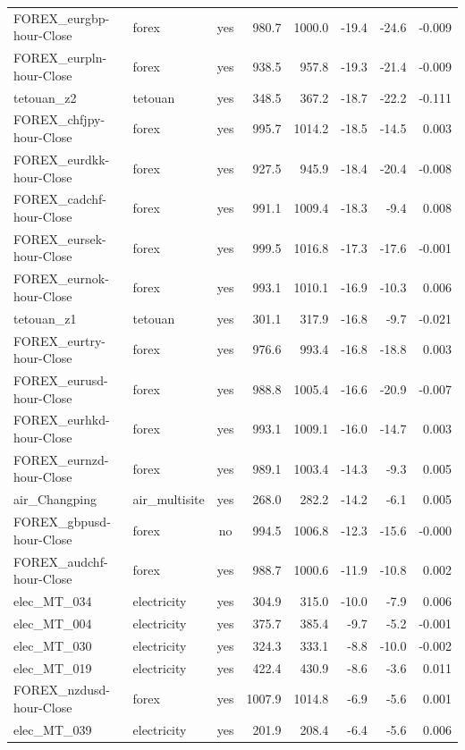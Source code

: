 \begin{longtable}{@{}l l c r r r r r@{}}
FOREX\_eurgbp-hour-Close & forex & yes & 980.7 & 1000.0 & -19.4 & -24.6 & -0.009 \\
FOREX\_eurpln-hour-Close & forex & yes & 938.5 & 957.8 & -19.3 & -21.4 & -0.009 \\
tetouan\_z2 & tetouan & yes & 348.5 & 367.2 & -18.7 & -22.2 & -0.111 \\
FOREX\_chfjpy-hour-Close & forex & yes & 995.7 & 1014.2 & -18.5 & -14.5 & 0.003 \\
FOREX\_eurdkk-hour-Close & forex & yes & 927.5 & 945.9 & -18.4 & -20.4 & -0.008 \\
FOREX\_cadchf-hour-Close & forex & yes & 991.1 & 1009.4 & -18.3 & -9.4 & 0.008 \\
FOREX\_eursek-hour-Close & forex & yes & 999.5 & 1016.8 & -17.3 & -17.6 & -0.001 \\
FOREX\_eurnok-hour-Close & forex & yes & 993.1 & 1010.1 & -16.9 & -10.3 & 0.006 \\
tetouan\_z1 & tetouan & yes & 301.1 & 317.9 & -16.8 & -9.7 & -0.021 \\
FOREX\_eurtry-hour-Close & forex & yes & 976.6 & 993.4 & -16.8 & -18.8 & 0.003 \\
FOREX\_eurusd-hour-Close & forex & yes & 988.8 & 1005.4 & -16.6 & -20.9 & -0.007 \\
FOREX\_eurhkd-hour-Close & forex & yes & 993.1 & 1009.1 & -16.0 & -14.7 & 0.003 \\
FOREX\_eurnzd-hour-Close & forex & yes & 989.1 & 1003.4 & -14.3 & -9.3 & 0.005 \\
air\_Changping & air\_multisite & yes & 268.0 & 282.2 & -14.2 & -6.1 & 0.005 \\
FOREX\_gbpusd-hour-Close & forex & no & 994.5 & 1006.8 & -12.3 & -15.6 & -0.000 \\
FOREX\_audchf-hour-Close & forex & yes & 988.7 & 1000.6 & -11.9 & -10.8 & 0.002 \\
elec\_MT\_034 & electricity & yes & 304.9 & 315.0 & -10.0 & -7.9 & 0.006 \\
elec\_MT\_004 & electricity & yes & 375.7 & 385.4 & -9.7 & -5.2 & -0.001 \\
elec\_MT\_030 & electricity & yes & 324.3 & 333.1 & -8.8 & -10.0 & -0.002 \\
elec\_MT\_019 & electricity & yes & 422.4 & 430.9 & -8.6 & -3.6 & 0.011 \\
FOREX\_nzdusd-hour-Close & forex & yes & 1007.9 & 1014.8 & -6.9 & -5.6 & 0.001 \\
elec\_MT\_039 & electricity & yes & 201.9 & 208.4 & -6.4 & -5.6 & 0.006 \\

\end{longtable}
